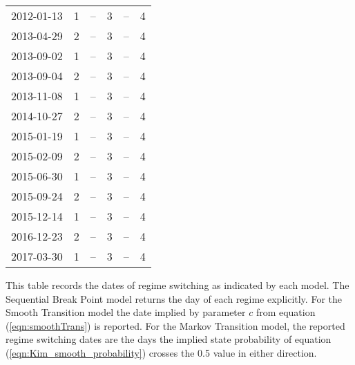 \begin{table}
\begin{threeparttable}
\begin{tabular}[c]{r r | r r | r r}
			2012-01-13 &  1 &         -- &  3 &         -- &  4 \\
			2013-04-29 &  2 &         -- &  3 &         -- &  4 \\
			2013-09-02 &  1 &         -- &  3 &         -- &  4 \\
			2013-09-04 &  2 &         -- &  3 &         -- &  4 \\
			2013-11-08 &  1 &         -- &  3 &         -- &  4 \\
			2014-10-27 &  2 &         -- &  3 &         -- &  4 \\
			2015-01-19 &  1 &         -- &  3 &         -- &  4 \\
			2015-02-09 &  2 &         -- &  3 &         -- &  4 \\
			2015-06-30 &  1 &         -- &  3 &         -- &  4 \\
			2015-09-24 &  2 &         -- &  3 &         -- &  4 \\
			2015-12-14 &  1 &         -- &  3 &         -- &  4 \\
			2016-12-23 &  2 &         -- &  3 &         -- &  4 \\
			2017-03-30 &  1 &         -- &  3 &         -- &  4 \\
			\hline
		\end{tabular}
		\begin{tablenotes}
			\item{\footnotesize This table records the dates of regime switching as indicated by each model. The Sequential Break Point model returns the day of each regime explicitly. For the Smooth Transition model the date implied by parameter $c$ from equation (\ref{eqn:smoothTrans}) is reported. For the Markov Transition model, the reported regime switching dates are the days the implied state probability of equation (\ref{eqn:Kim_smooth_probability}) crosses the 0.5 value in either direction.}
		\end{tablenotes}
	\end{threeparttable}
\end{table}

\clearpage
